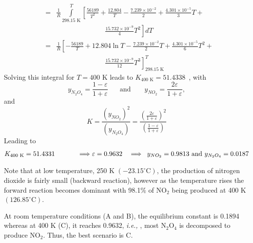 \documentclass[calculator,allquestions,datasheet,mock,Pens]{exam_newMarcus2}
\newcommand{\frc}{\displaystyle\frac}
\newcommand{\ie}{{\it i.e., }}
\begin{document}
\begin{question}
\begin{enumerate}[a)]
{\begin{enumerate}[A.]
\begin{eqnarray}
                                                &=& \frc{1}{R}\int\limits_{298.15\text{ K}}^{T} \left[\frc{56189}{T^{2}} + \frc{12.804}{T} - \frc{7.239\times 10^{-2}}{2} + \frc{4.301\times 10^{-5}}{3}T + \right. \nonumber \\
                                                 && \hspace{3cm}\left.\frc{15.732\times 10^{-9}}{4}T^{2}\right]dT \nonumber \\
                                                &=& \frc{1}{R}\left[-\frc{56189}{T} + 12.804\ln{T} - \frc{7.239\times 10^{-2}}{2}T + \frc{4.301\times 10^{-5}}{6}T^{2} + \right. \nonumber \\
                                                &&\hspace{3cm}\left.\frc{15.732\times 10^{-9}}{12}T^{3}\right]_{298.15\text{ K}}^{T} \nonumber
\end{eqnarray}
Solving this integral for $T=400$ K leads to $K_{400\text{ K}} = 51.4338$~, with
         \begin{displaymath}
            y_{N_{2}O_{4}} = \frc{1-\varepsilon}{1+\varepsilon}\;\;\;\;\;\text{ and }\;\;\;\;\;\; y_{NO_{2}} = \frc{2\varepsilon}{1+\varepsilon},
         \end{displaymath}
         and
         \begin{displaymath}
             K = \frac{\left(y_{NO_{2}}\right)^{2}}{\left(y_{N_{2}O_{4}}\right)} = \frc{\left(\frc{2\varepsilon}{1+\varepsilon}\right)^{2}}{\left(\frc{1-\varepsilon}{1+\varepsilon}\right)}
         \end{displaymath}
         Leading to~
         \begin{displaymath}
             K_{400\text{ K}}   = 51.4331 \hspace{1.2cm} \Longrightarrow \varepsilon = 0.9632  \hspace{.35cm} \Longrightarrow \;\;  y_{NO_{2}} = 0.9813 \text{ and } y_{N_{2}O_{4}} = 0.0187
         \end{displaymath}
         
        Note that at low temperature, 250 K $\left(-23.15^{\circ}\text{C}\right)$, the production of nitrogen dioxide is fairly small (backward reaction), however as the temperature rises the forward reaction becomes dominant with 98.1$\%$ of NO$_{2}$ being produced at 400 K$\left(126.85^{\circ}\text{C}\right)$.

           \end{enumerate} 
         At room temperature conditions (A and B), the equilibrium constant is 0.1894 whereas at 400 K (C), it reaches 0.9632, \ie, most N$_{2}$O$_{4}$ is decomposed to produce NO$_{2}$. Thus, the best scenario is C.~
             }
          

\end{enumerate}
\end{question}
\end{document}
